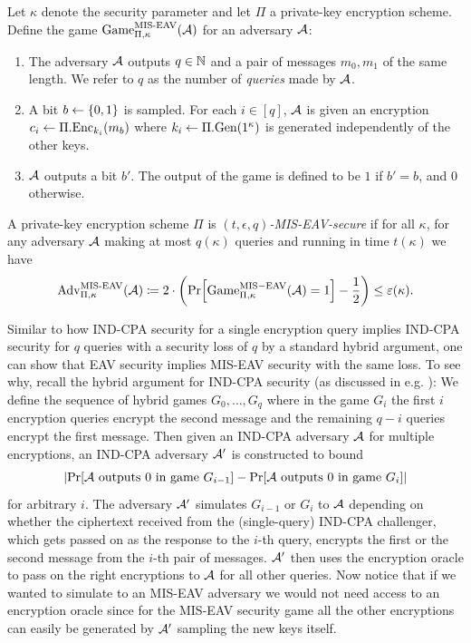 \begin{definition}
	Let $\kappa$ denote the security parameter and let $\Pi$ a private-key encryption scheme. Define the game $\mathrm{Game}_{\Pi, \kappa}^{\mathrm{MIS\text{-}EAV}}(\mathcal{A})$ for an adversary $\mathcal{A}$:
	\begin{enumerate}[1.]
		\item The adversary $\mathcal{A}$ outputs $q \in \mathbb{N}$ and a pair of messages $m_0, m_1$ of the same length. We refer to $q$ as the number of \emph{queries} made by $\mathcal{A}$.
		\item A bit $b \leftarrow \{0, 1\}$ is sampled. For each $i \in [q]$, $\mathcal{A}$ is given an encryption $c_i \leftarrow \Pi.\mathrm{Enc}_{k_i}(m_b)$ where $k_i \leftarrow \Pi.\mathrm{Gen}(1^\kappa)$ is generated independently of the other keys.
		\item $\mathcal{A}$ outputs a bit $b'$. The output of the game is defined to be $1$ if $b' = b$, and $0$ otherwise.
	\end{enumerate}
\end{definition}

\begin{definition}
	A private-key encryption scheme $\Pi$ is \emph{$(t, \epsilon, q)$-MIS-EAV-secure} if for all $\kappa$, for any adversary $\mathcal{A}$ making at most $q(\kappa)$ queries and running in time $t(\kappa)$ we have
	\begin{align*}
		\advantage{\Pi}{\kappa}{MIS\text{-}EAV}(\adv) \coloneqq 2 \cdot \left(\pr{\game{\Pi}{\kappa}{MIS-EAV}(\adv) = 1} - \frac{1}{2}\right) \le \epsilon(\kappa).
	\end{align*}
\end{definition}

Similar to how IND-CPA security for a single encryption query implies IND-CPA security for $q$ queries with a security loss of $q$ by a standard hybrid argument, one can show that EAV security implies MIS-EAV security with the same loss. To see why, recall the hybrid argument for IND-CPA security (as discussed in e.g. \cite[Theorem 12.6]{introduction-to-modern-cryptography}): We define the sequence of hybrid games $G_0, \ldots, G_q$ where in the game $G_i$ the first $i$ encryption queries encrypt the second message and the remaining $q - i$ queries encrypt the first message. Then given an IND-CPA adversary $\mathcal{A}$ for multiple encryptions, an IND-CPA adversary $\mathcal{A}'$ is constructed to bound
\[
	\abs*{\pr{\adv \text{ outputs } 0 \text{ in game } G_{i - 1}} - \pr{\adv \text{ outputs } 0 \text{ in game } G_{i}}}
\]
for arbitrary $i$.
The adversary $\mathcal{A}'$ simulates $G_{i - 1}$ or $G_{i}$ to $\mathcal{A}$ depending on whether the ciphertext received from the (single-query) IND-CPA challenger, which gets passed on as the response to the $i$-th query, encrypts the first or the second message from the $i$-th pair of messages. $\mathcal{A}'$ then uses the encryption oracle to pass on the right encryptions to $\mathcal{A}$ for all other queries. Now notice that if we wanted to simulate to an MIS-EAV adversary we would not need access to an encryption oracle since for the MIS-EAV security game all the other encryptions can easily be generated by $\mathcal{A}'$ sampling the new keys itself.

